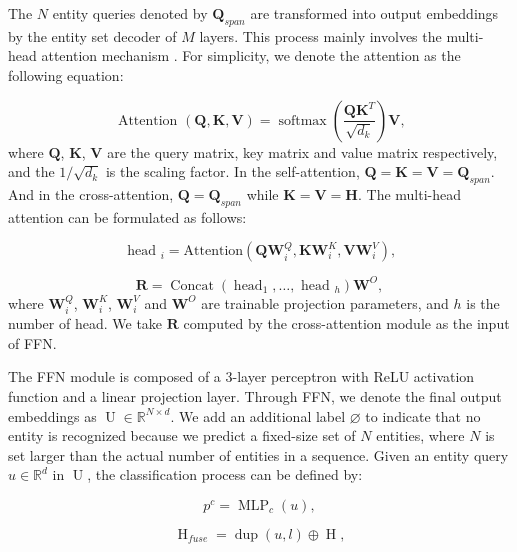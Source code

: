\documentclass{article}
\begin{document}
The $N$ entity queries denoted by $\mathbf{Q}_{span}$ are transformed into output embeddings by the entity set decoder of $M$ layers. This process mainly involves the multi-head attention mechanism \cite{vaswani2017attention}. For simplicity, we denote the attention as the following equation:

\begin{equation}
\text { Attention }(\mathbf{Q}, \mathbf{K}, \mathbf{V})=\operatorname{softmax}\left(\frac{\mathbf{Q K}^{T}}{\sqrt{d_{k}}}\right) \mathbf{V},
\end{equation}
where $\mathbf{Q}$, $\mathbf{K}$, $\mathbf{V}$ are the query matrix, key matrix and value matrix respectively, and the $1 / \sqrt{d_{k}}$ is the scaling factor. In the self-attention, $\mathbf{Q}=\mathbf{K}=\mathbf{V}=\mathbf{Q}_{span}$. And in the cross-attention, $\mathbf{Q} = \mathbf{Q}_{span}$ while $\mathbf{K} = \mathbf{V} = \mathbf{H}$. The multi-head attention can be formulated as follows:

\begin{equation}
\text { head }_{i}=\text {Attention}\left(\mathbf{Q} \mathbf{W}_{i}^{Q}, \mathbf{K} \mathbf{W}_{i}^{K}, \mathbf{V} \mathbf{W}_{i}^{V}\right),
\end{equation}

\begin{equation}
\mathbf{R}=\operatorname{Concat}\left(\operatorname{head}_{1}, \ldots, \text { head }_{h}\right) \mathbf{W}^{O},
\end{equation}
where $\mathbf{W}_{i}^{Q}$, $\mathbf{W}_{i}^{K}$, $\mathbf{W}_{i}^{V}$ and $\mathbf{W}^{O}$ are trainable projection parameters, and $h$ is the number of head. We take $\mathbf{R}$ computed by the cross-attention module as the input of FFN.

The FFN module is composed of a 3-layer perceptron with ReLU activation function and a linear projection layer. Through FFN, we denote the final output embeddings as $\operatorname{U} \in \mathbb{R}^{N \times d}$. We add an additional label $\varnothing$ to indicate that no entity is recognized because we predict a fixed-size set of $N$ entities, where $N$ is set larger than the actual number of entities in a sequence. Given an entity query $u \in \mathbb{R}^{d}$ in $\operatorname{U}$, the classification process can be defined by:

\begin{equation}
    p^c = \operatorname{MLP}_c(u),
\end{equation}

\begin{equation}
    \operatorname{H}_{fuse} = \operatorname{dup}(u,l) \oplus \operatorname{H},
\end{equation}
\end{document}
